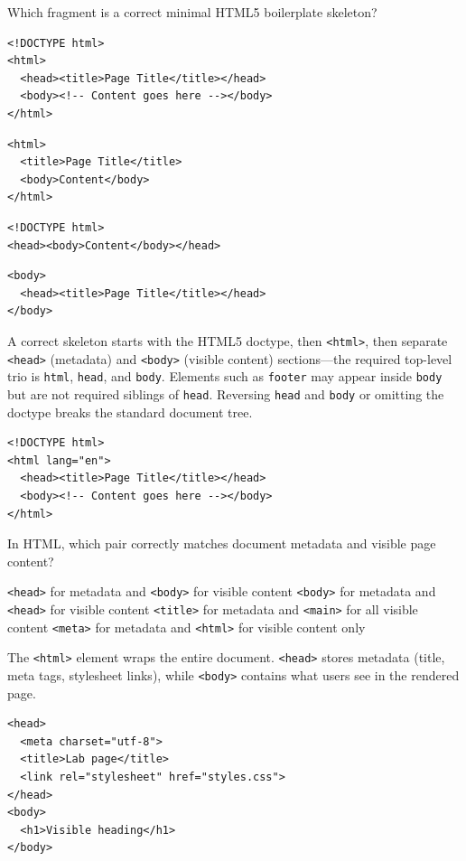 \newpage


\question[4]
Which fragment is a correct minimal HTML5 boilerplate skeleton?
\begin{choices}
  \CorrectChoice
\begin{lstlisting}[style=htmlinline]
<!DOCTYPE html>
<html>
  <head><title>Page Title</title></head>
  <body><!-- Content goes here --></body>
</html>
\end{lstlisting}
  \choice
\begin{lstlisting}[style=htmlinline]
<html>
  <title>Page Title</title>
  <body>Content</body>
</html>
\end{lstlisting}
  \choice
\begin{lstlisting}[style=htmlinline]
<!DOCTYPE html>
<head><body>Content</body></head>
\end{lstlisting}
  \choice
\begin{lstlisting}[style=htmlinline]
<body>
  <head><title>Page Title</title></head>
</body>
\end{lstlisting}
\end{choices}
\begin{solution}
  A correct skeleton starts with the HTML5 doctype, then \texttt{<html>}, then separate \texttt{<head>} (metadata) and \texttt{<body>} (visible content) sections---the required top-level trio is \texttt{html}, \texttt{head}, and \texttt{body}. Elements such as \texttt{footer} may appear inside \texttt{body} but are not required siblings of \texttt{head}. Reversing \texttt{head} and \texttt{body} or omitting the doctype breaks the standard document tree.
\begin{lstlisting}[style=htmlinline]
<!DOCTYPE html>
<html lang="en">
  <head><title>Page Title</title></head>
  <body><!-- Content goes here --></body>
</html>
\end{lstlisting}
\end{solution}


\newpage

\question[4]
In HTML, which pair correctly matches document metadata and visible page content?
\begin{choices}
  \CorrectChoice \texttt{<head>} for metadata and \texttt{<body>} for visible content
  \choice \texttt{<body>} for metadata and \texttt{<head>} for visible content
  \choice \texttt{<title>} for metadata and \texttt{<main>} for all visible content
  \choice \texttt{<meta>} for metadata and \texttt{<html>} for visible content only
\end{choices}
\begin{solution}
  The \texttt{<html>} element wraps the entire document. \texttt{<head>} stores metadata (title, meta tags, stylesheet links), while \texttt{<body>} contains what users see in the rendered page.
\begin{lstlisting}[style=htmlinline]
<head>
  <meta charset="utf-8">
  <title>Lab page</title>
  <link rel="stylesheet" href="styles.css">
</head>
<body>
  <h1>Visible heading</h1>
</body>
\end{lstlisting}
\end{solution}

